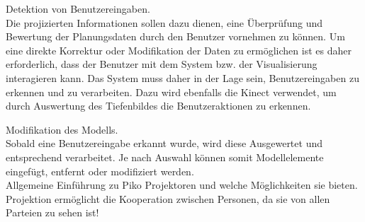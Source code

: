Detektion von Benutzereingaben.\\
Die projizierten Informationen sollen dazu dienen, eine Überprüfung und Bewertung der Planungsdaten durch den Benutzer vornehmen zu können. Um eine direkte Korrektur oder Modifikation der Daten zu ermöglichen ist es daher erforderlich, dass der Benutzer mit dem System bzw. der Visualisierung interagieren kann. Das System muss daher in der Lage sein, Benutzereingaben zu erkennen und zu verarbeiten. Dazu wird ebenfalls die Kinect verwendet, um durch Auswertung des Tiefenbildes die Benutzeraktionen zu erkennen.

Modifikation des Modells.\\
Sobald eine Benutzereingabe erkannt wurde, wird diese Ausgewertet und entsprechend verarbeitet. Je nach Auswahl können somit Modellelemente eingefügt, entfernt oder modifiziert werden.\\

Allgemeine Einführung zu Piko Projektoren und welche Möglichkeiten sie bieten.\\%
Projektion ermöglicht die Kooperation zwischen Personen, da sie von allen Parteien zu sehen ist!